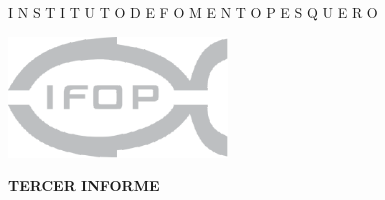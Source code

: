 \documentclass[12pt, oneside]{article} %
\begin{document}
\begin{titlepage}

\renewcommand{\baselinestretch}{1.3}
\null
\large
\begin{center}
\fontsize{12pt}{8pt}\selectfont
{}\uppercase\expandafter{}  I \hspace{0.3pt} N  \hspace{0.3pt} S  \hspace{0.3pt}  T \hspace{0.3pt}   I \hspace{0.3pt}    T \hspace{0.3pt}    U   \hspace{0.3pt}  T  \hspace{0.3pt}  O \hspace{20pt} D  \hspace{0.3pt}  E \hspace{20pt}  F   \hspace{0.3pt} O  \hspace{0.3pt}  M \hspace{0.3pt}   E \hspace{0.3pt}   N  \hspace{0.3pt}  T \hspace{0.3pt}   O  \hspace{20pt}  P \hspace{0.3pt}   E  \hspace{0.3pt}  S \hspace{0.3pt}   Q   \hspace{0.3pt} U  \hspace{0.3pt}  E \hspace{0.3pt}   R  \hspace{0.3pt}  O 
\end{center}
\normalsize


 \hfill  \includegraphics[height=3.2cm]{Figuras/logoIFOPgris_Portada.pdf}

\vspace*{0.5cm} 

\centering \fontsize{14pt}{8pt}\selectfont
            \vspace*{1mm} 
            \hfill \textbf{TERCER INFORME}
        

\end{titlepage}
\end{document}

